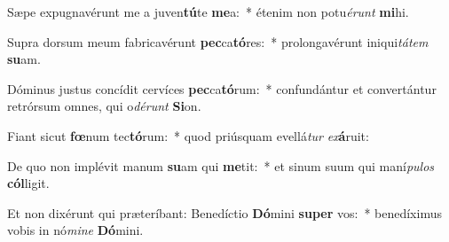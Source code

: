 \item Sæpe expugnavérunt me a juven\textbf{tú}te \textbf{me}a:~* étenim non potu\textit{é}\textit{runt} \textbf{mi}hi.
\item Supra dorsum meum fabricavérunt \textbf{pec}ca\textbf{tó}res:~* prolongavérunt iniqui\textit{tá}\textit{tem} \textbf{su}am.
\item Dóminus justus concídit cervíces \textbf{pec}ca\textbf{tó}rum:~* confundántur et convertántur retrórsum omnes, qui o\textit{dé}\textit{runt} \textbf{Si}on.
\item Fiant sicut \textbf{fœ}num tec\textbf{tó}rum:~* quod priúsquam evellá\textit{tur} \textit{ex}\textbf{á}ruit:
\item De quo non implévit manum \textbf{su}am qui \textbf{me}tit:~* et sinum suum qui maní\textit{pu}\textit{los} \textbf{cól}ligit.
\item Et non dixérunt qui præteríbant: Benedíctio \textbf{Dó}mini \textbf{su}\textbf{per} vos:~* benedíximus vobis in nó\textit{mi}\textit{ne} \textbf{Dó}mini.
